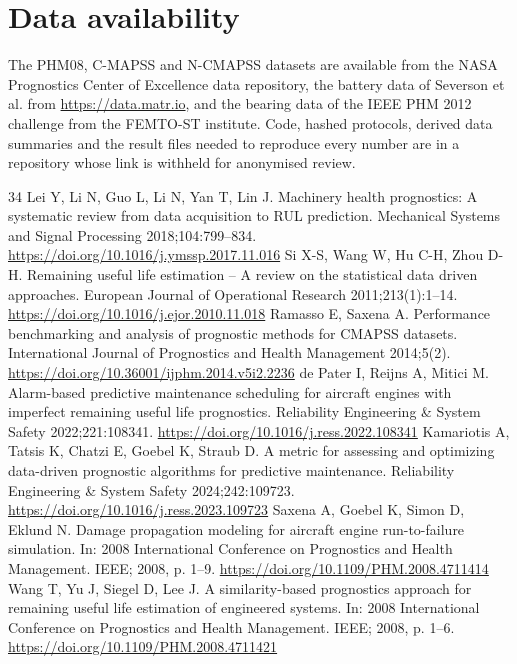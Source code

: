 \documentclass[a4paper,fleqn,doubleblind]{cas-dc}
\begin{document}
\section*{Data availability}

\noindent The PHM08, C-MAPSS and N-CMAPSS datasets are available from the NASA Prognostics Center of Excellence data repository, the battery data of Severson et al. \cite{severson2019} from \url{https://data.matr.io}, and the bearing data of the IEEE PHM 2012 challenge \cite{nectoux2012} from the FEMTO-ST institute. Code, hashed protocols, derived data summaries and the result files needed to reproduce every number are in a repository whose link is withheld for anonymised review.

\begin{thebibliography}{34}
 Lei Y, Li N, Guo L, Li N, Yan T, Lin J. Machinery health prognostics: A systematic review from data acquisition to RUL prediction. Mechanical Systems and Signal Processing 2018;104:799--834. \url{https://doi.org/10.1016/j.ymssp.2017.11.016}
 Si X-S, Wang W, Hu C-H, Zhou D-H. Remaining useful life estimation -- A review on the statistical data driven approaches. European Journal of Operational Research 2011;213(1):1--14. \url{https://doi.org/10.1016/j.ejor.2010.11.018}
 Ramasso E, Saxena A. Performance benchmarking and analysis of prognostic methods for CMAPSS datasets. International Journal of Prognostics and Health Management 2014;5(2). \url{https://doi.org/10.36001/ijphm.2014.v5i2.2236}
 de Pater I, Reijns A, Mitici M. Alarm-based predictive maintenance scheduling for aircraft engines with imperfect remaining useful life prognostics. Reliability Engineering \& System Safety 2022;221:108341. \url{https://doi.org/10.1016/j.ress.2022.108341}
 Kamariotis A, Tatsis K, Chatzi E, Goebel K, Straub D. A metric for assessing and optimizing data-driven prognostic algorithms for predictive maintenance. Reliability Engineering \& System Safety 2024;242:109723. \url{https://doi.org/10.1016/j.ress.2023.109723}
 Saxena A, Goebel K, Simon D, Eklund N. Damage propagation modeling for aircraft engine run-to-failure simulation. In: 2008 International Conference on Prognostics and Health Management. IEEE; 2008, p. 1--9. \url{https://doi.org/10.1109/PHM.2008.4711414}
 Wang T, Yu J, Siegel D, Lee J. A similarity-based prognostics approach for remaining useful life estimation of engineered systems. In: 2008 International Conference on Prognostics and Health Management. IEEE; 2008, p. 1--6. \url{https://doi.org/10.1109/PHM.2008.4711421}

\end{thebibliography}
\end{document}
